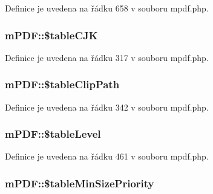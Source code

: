 Definice je uvedena na řádku 658 v souboru mpdf.\-php.

\hypertarget{classm_p_d_f_ab6f6ee7065eda3130c3726fbd198f5f1}{
\subsubsection[{\$table\-C\-J\-K}]{\setlength{\rightskip}{0pt plus 5cm}m\-P\-D\-F\-::\$table\-C\-J\-K}}\label{classm_p_d_f_ab6f6ee7065eda3130c3726fbd198f5f1}


Definice je uvedena na řádku 317 v souboru mpdf.\-php.

\hypertarget{classm_p_d_f_a6a054bfe61fb71a868b9b5df4e57a6fc}{
\subsubsection[{\$table\-Clip\-Path}]{\setlength{\rightskip}{0pt plus 5cm}m\-P\-D\-F\-::\$table\-Clip\-Path}}\label{classm_p_d_f_a6a054bfe61fb71a868b9b5df4e57a6fc}


Definice je uvedena na řádku 342 v souboru mpdf.\-php.

\hypertarget{classm_p_d_f_aa8d31708d6bf12860f50f126e5118742}{
\subsubsection[{\$table\-Level}]{\setlength{\rightskip}{0pt plus 5cm}m\-P\-D\-F\-::\$table\-Level}}\label{classm_p_d_f_aa8d31708d6bf12860f50f126e5118742}


Definice je uvedena na řádku 461 v souboru mpdf.\-php.

\hypertarget{classm_p_d_f_a272025882c1c9dd546bb3e605b3bd69b}{
\subsubsection[{\$table\-Min\-Size\-Priority}]{\setlength{\rightskip}{0pt plus 5cm}m\-P\-D\-F\-::\$table\-Min\-Size\-Priority}}\label{classm_p_d_f_a272025882c1c9dd546bb3e605b3bd69b}


